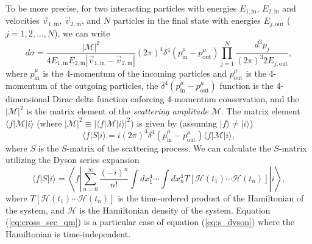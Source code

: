 To be more precise, for two interacting particles with energies $E_{1,{\text{in}}}$, $E_{2,{\text{in}}}$ and velocities $\vec{v}_{1,{\text{in}}}$, $\vec{v}_{2,{\text{in}}}$, and $N$ particles in the final state with energies $E_{j,{\text{out}}}$ ($j=1,2,..., N$), we can write \cite{schartz}
\begin{equation}
    \label{eq:cross_sec_qft}
    d \sigma = \frac{|\mathcal{M}|^2}{4 E_{1,{\text{in}}} E_{2,{\text{in}}} |\vec{v}_{1,{\text{in}}} - \vec{v}_{2,{\text{in}}}|} (2\pi)^4 \delta^4(p^\mu_{\text{in}} - p^\mu_{\text{out}}) \prod_{j=1}^N \frac{d^3 p_j}{(2\pi)^3 2E_{j, {\text{out}}}}, 
\end{equation}
where $p^\mu_{\text{in}}$ is the 4-momentum of the incoming particles and $p^\mu_{\text{out}}$ is the 4-momentum of the outgoing particles, the $\delta^4(p^\mu_{\text{in}} - p^\mu_{\text{out}})$ function is the 4-dimensional Dirac delta function enforcing 4-momentum conservation, and the $|\mathcal{M}|^2$ is the matrix element of the \emph{scattering amplitude} $\mathcal{M}$.
The matrix element $\langle f |\mathcal{M} | i \rangle$ (where $|\mathcal{M}|^2 \equiv |\langle f |\mathcal{M} | i \rangle |^2$) is given by (assuming $ | f \rangle \neq | i \rangle$)
\begin{equation}
    \label{eq:M_matrix}
    \langle f | S | i \rangle = i (2\pi)^4 \delta^4(p^\mu_{\text{in}} - p^\mu_{\text{out}})  \langle f | \mathcal{M} | i \rangle,
\end{equation}
where $S$ is the $S$-matrix of the scattering process.
We can calculate the $S$-matrix utilizing the Dyson series expansion \cite{schartz}
\begin{equation}
    \label{eq:s_dyson}
    \langle f | S | i \rangle =\left\langle f \left|\sum_{n=0}^{\infty} \frac{(-i)^n}{n !} \int d x_1^4 \cdots \int d x_n^4 T\left[\mathcal{H}\left(t_1\right) \cdots \mathcal{H}\left(t_n\right)\right]\right| i \right\rangle,
\end{equation}
where $T\left[\mathcal{H}\left(t_1\right) \cdots \mathcal{H}\left(t_n\right)\right]$ is the time-ordered product of the Hamiltonian of the system, and $\mathcal{H}$ is the Hamiltonian density of the system.
Equation (\ref{eq:cross_sec_qm}) is a particular case of equation (\ref{eq:s_dyson}) where the Hamiltonian is time-independent.


